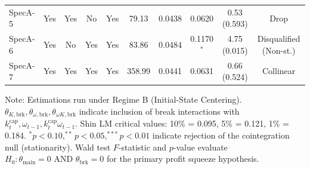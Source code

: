 \begin{table}[h!]
{\begin{tabular}{lccccccccc}
SpecA-5 & Yes & Yes & No & Yes & 79.13 & 0.0438 & 0.0620 & 0.53 (0.593) & Drop \\
SpecA-6 & Yes & No & Yes & Yes & 83.86 & 0.0484 & 0.1170$^{*}$ & 4.75 (0.015) & Disqualified (Non-st.) \\
SpecA-7 & Yes & Yes & Yes & Yes & 358.99 & 0.0441 & 0.0631 & 0.66 (0.524) & Collinear \\
\bottomrule
\end{tabular}%
}
\vspace{4pt}
\begin{minipage}{\textwidth}
\footnotesize Note: Estimations run under Regime B (Initial-State Centering). $\theta_{K,\text{brk}}, \theta_{\omega,\text{brk}}, \theta_{\omega K,\text{brk}}$ indicate inclusion of break interactions with $k_t^{\text{cap}}, \omega_{t-1}, k_t^{\text{cap}}\omega_{t-1}$. Shin LM critical values: 10\% = 0.095, 5\% = 0.121, 1\% = 0.184. $^{*}p<0.10, ^{**}p<0.05, ^{***}p<0.01$ indicate rejection of the cointegration null (stationarity). Wald test $F$-statistic and $p$-value evaluate $H_0: \theta_{\text{main}} = 0 \text{ AND } \theta_{\text{brk}} = 0$ for the primary profit squeeze hypothesis.
\end{minipage}
\end{table}

